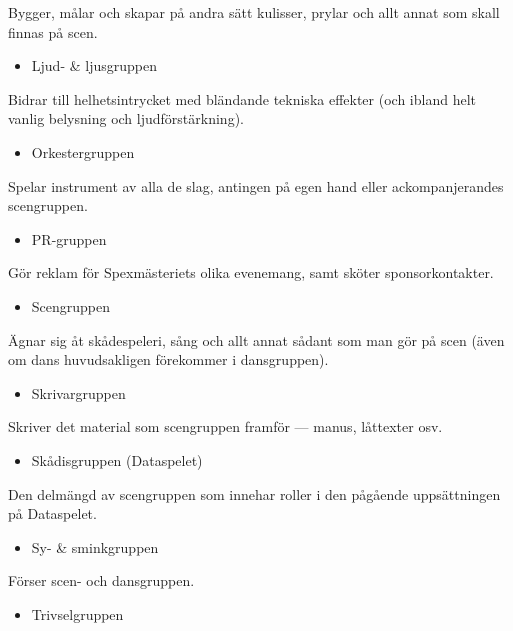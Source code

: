 Bygger, målar och skapar på andra sätt kulisser, prylar och allt annat som skall finnas på scen.

\begin{itemize}
  \item Ljud- \& ljusgruppen
\end{itemize}

Bidrar till helhetsintrycket med bländande tekniska effekter (och ibland helt vanlig belysning och ljudförstärkning).

\begin{itemize}
  \item Orkestergruppen
\end{itemize}

Spelar instrument av alla de slag, antingen på egen hand eller ackompanjerandes scengruppen.

\begin{itemize}
  \item PR-gruppen
\end{itemize}

Gör reklam för Spexmästeriets olika evenemang, samt sköter sponsorkontakter.

\begin{itemize}
  \item Scengruppen
\end{itemize}

Ägnar sig åt skådespeleri, sång och allt annat sådant som man gör på scen (även om dans huvudsakligen förekommer i dansgruppen).

\begin{itemize}
  \item Skrivargruppen
\end{itemize}

Skriver det material som scengruppen framför --- manus, låttexter osv.

\begin{itemize}
  \item Skådisgruppen (Dataspelet)
\end{itemize}

Den delmängd av scengruppen som innehar roller i den pågående uppsättningen på Dataspelet.

\begin{itemize}
  \item Sy- \& sminkgruppen
\end{itemize}

Förser scen- och dansgruppen.

\begin{itemize}
  \item Trivselgruppen
\end{itemize}

